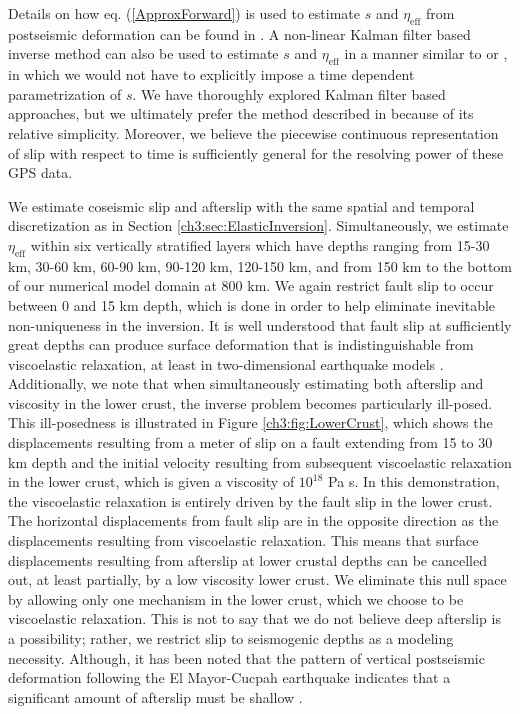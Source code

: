 Details on how eq. (\ref{ApproxForward}) is used to estimate $s$ and $\eta_\mathrm{eff}$ from postseismic deformation can be found in \citet{Hines2016}.  A non-linear Kalman filter based inverse method can also be used to estimate $s$ and $\eta_{\mathrm{eff}}$ in a manner similar to \citet{Segall1997} or \citet{McGuire2003}, in which we would not have to explicitly impose a time dependent parametrization of $s$. We have thoroughly explored Kalman filter based approaches, but we ultimately prefer the method described in \citet{Hines2016} because of its relative simplicity. Moreover, we believe the piecewise continuous representation of slip with respect to time is sufficiently general for the resolving power of these GPS data.

We estimate coseismic slip and afterslip with the same spatial and temporal discretization as in Section \ref{ch3:sec:ElasticInversion}. Simultaneously, we estimate $\eta_{\mathrm{eff}}$ within six vertically stratified layers which have depths ranging from 15-30 km, 30-60 km, 60-90 km, 90-120 km, 120-150 km, and from 150 km to the bottom of our numerical model domain at 800 km.  We again restrict fault slip to occur between 0 and 15 km depth, which is done in order to help eliminate inevitable non-uniqueness in the inversion.  It is well understood that fault slip at sufficiently great depths can produce surface deformation that is indistinguishable from viscoelastic relaxation, at least in two-dimensional earthquake models \citep{Savage1990}.  Additionally, we note that when simultaneously estimating both afterslip and viscosity in the lower crust, the inverse problem becomes particularly ill-posed. This ill-posedness is illustrated in Figure \ref{ch3:fig:LowerCrust}, which shows the displacements resulting from a meter of slip on a fault extending from 15 to 30 km depth and the initial velocity resulting from subsequent viscoelastic relaxation in the lower crust, which is given a viscosity of $10^{18}$ Pa s.  In this demonstration, the viscoelastic relaxation is entirely driven by the fault slip in the lower crust.  The horizontal displacements from fault slip are in the opposite direction as the displacements resulting from viscoelastic relaxation.  This means that surface displacements resulting from afterslip at lower crustal depths can be cancelled out, at least partially, by a low viscosity lower crust.  We eliminate this null space by allowing only one mechanism in the lower crust, which we choose to be viscoelastic relaxation.  This is not to say that we do not believe deep afterslip is a possibility; rather, we restrict slip to seismogenic depths as a modeling necessity. Although, it has been noted that the pattern of vertical postseismic deformation following the El Mayor-Cucpah earthquake indicates that a significant amount of afterslip must be shallow \citep{Rollins2015}.  
 
